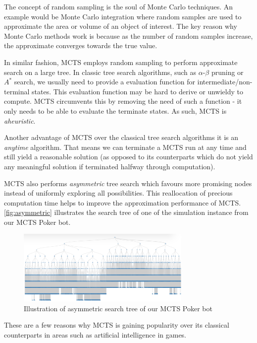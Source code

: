 \documentclass[11pt, a4paper, oneside]{article}
\begin{document}
The concept of random sampling is the soul of Monte Carlo techniques. An example would be Monte Carlo integration where random samples are used to approximate the area or volume of an object of interest. The key reason why Monte Carlo methods work is because as the number of random samples increase, the approximate converges towards the true value.

In similar fashion, MCTS employs random sampling to perform approximate search on a large tree. In classic tree search algorithms, such as $\alpha$-$\beta$ pruning or $A^*$ search, we usually need to provide a evaluation function for intermediate/non-terminal states. This evaluation function may be hard to derive or unwieldy to compute. MCTS circumvents this by removing the need of such a function - it only needs to be able to evaluate the terminate states. As such, MCTS is \textit{aheuristic}.

Another advantage of MCTS over the classical tree search algorithms it is an \textit{anytime} algorithm. That means we can terminate a MCTS run at any time and still yield a reasonable solution (as opposed to its counterparts which do not yield any meaningful solution if terminated halfway through computation).

MCTS also performs \textit{asymmetric} tree search which favours more promising nodes instead of uniformly exploring all possibilities. This reallocation of precious computation time helps to improve the approximation performance of MCTS. \autoref{fig:asymmetric} illustrates the search tree of one of the simulation instance from our MCTS Poker bot.

\begin{figure}[H]
	\centering
	\includegraphics[width=0.75\textwidth]{asymmetric.png}
	\caption{Illustration of asymmetric search tree of our MCTS Poker bot}
	\label{fig:asymmetric}
\end{figure}

These are a few reasons why MCTS is gaining popularity over its classical counterparts in areas such as artificial intelligence in games.
\end{document}

